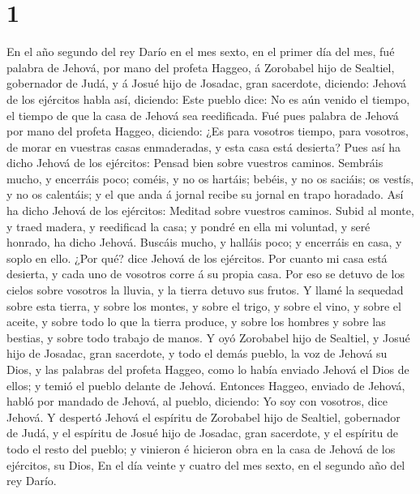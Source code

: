 \hypertarget{section}{%
\section{1}\label{section}}

 En el año segundo del rey Darío en el mes sexto, en el
primer día del mes, fué palabra de Jehová, por mano del profeta Haggeo,
á Zorobabel hijo de Sealtiel, gobernador de Judá, y á Josué hijo de
Josadac, gran sacerdote, diciendo:  Jehová de los
ejércitos habla así, diciendo: Este pueblo dice: No es aún venido el
tiempo, el tiempo de que la casa de Jehová sea reedificada.
 Fué pues palabra de Jehová por mano del profeta Haggeo,
diciendo:  ¿Es para vosotros tiempo, para vosotros, de
morar en vuestras casas enmaderadas, y esta casa está desierta?
 Pues así ha dicho Jehová de los ejércitos: Pensad bien
sobre vuestros caminos.  Sembráis mucho, y encerráis poco;
coméis, y no os hartáis; bebéis, y no os saciáis; os vestís, y no os
calentáis; y el que anda á jornal recibe su jornal en trapo horadado.
 Así ha dicho Jehová de los ejércitos: Meditad sobre
vuestros caminos.  Subid al monte, y traed madera, y
reedificad la casa; y pondré en ella mi voluntad, y seré honrado, ha
dicho Jehová.  Buscáis mucho, y halláis poco; y encerráis
en casa, y soplo en ello. ¿Por qué? dice Jehová de los ejércitos. Por
cuanto mi casa está desierta, y cada uno de vosotros corre á su propia
casa.  Por eso se detuvo de los cielos sobre vosotros la
lluvia, y la tierra detuvo sus frutos.  Y llamé la
sequedad sobre esta tierra, y sobre los montes, y sobre el trigo, y
sobre el vino, y sobre el aceite, y sobre todo lo que la tierra produce,
y sobre los hombres y sobre las bestias, y sobre todo trabajo de manos.
 Y oyó Zorobabel hijo de Sealtiel, y Josué hijo de
Josadac, gran sacerdote, y todo el demás pueblo, la voz de Jehová su
Dios, y las palabras del profeta Haggeo, como lo había enviado Jehová el
Dios de ellos; y temió el pueblo delante de Jehová. 
Entonces Haggeo, enviado de Jehová, habló por mandado de Jehová, al
pueblo, diciendo: Yo soy con vosotros, dice Jehová.  Y
despertó Jehová el espíritu de Zorobabel hijo de Sealtiel, gobernador de
Judá, y el espíritu de Josué hijo de Josadac, gran sacerdote, y el
espíritu de todo el resto del pueblo; y vinieron é hicieron obra en la
casa de Jehová de los ejércitos, su Dios,  En el día
veinte y cuatro del mes sexto, en el segundo año del rey Darío.

